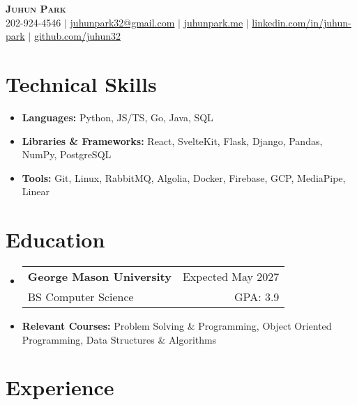 \documentclass[letterpaper,11pt]{article}
\makeatletter
\newcommand{\resumeItem}[1]{
  \item{
    {#1}
  }
}
\newcommand{\resumeItemThin}[1]{
  \item{
    {#1 \vspace{-5pt}}
  }
}
\newcommand{\resumeSubheading}[4]{
    \item
    \begin{tabular*}{0.985\textwidth}[t]{l@{\extracolsep{\fill}}r@{\hspace{-0.1in}}}
        {\textbf{#1}} & {#2} \\
        #3 &  #4 \\
    \end{tabular*}\vspace{-5pt}
}
\newcommand{\resumeSubHeadingListStart}{\begin{itemize}[leftmargin=0.00in, rightmargin=-0.2in, label={}]\vspace{3pt}}
\newcommand{\resumeSubHeadingListEnd}{\end{itemize}\vspace{-15pt}}
\newcommand{\resumeItemListStart}{\vspace{3pt}\begin{itemize}[leftmargin=0.15in, rightmargin=0.15in]}
\newcommand{\resumeItemListEnd}{\end{itemize}\vspace{-5pt}}
\makeatother
\begin{document}

\begin{center}
  \textbf{\Huge \scshape {Juhun Park}} \\ \vspace{3pt}
   202-924-4546 $|$
  \href{mailto:juhunpark32@gmail.com}{juhunpark32@gmail.com} $|$
  \href{https://www.juhunpark.me/}{juhunpark.me} $|$
  \href{https://linkedin.com/in/juhun-park}{linkedin.com/in/juhun-park} $|$
  \href{https://github.com/juhun32}{github.com/juhun32} \\
\end{center}

\vspace{-10pt}


\section{Technical Skills}
\resumeItemListStart
\resumeItemThin{\textbf{Languages: }{Python, JS/TS, Go, Java, SQL}}\\
\resumeItemThin{\textbf{Libraries \& Frameworks: }{React, SvelteKit, Flask, Django, Pandas, NumPy, PostgreSQL}}\\
\resumeItemThin{\textbf{Tools: }{Git, Linux, RabbitMQ, Algolia, Docker, Firebase, GCP, MediaPipe, Linear}}\\

\resumeItemListEnd


\section{Education}
\resumeSubHeadingListStart
\resumeSubheading
{George Mason University}{Expected May 2027}
{BS Computer Science}{GPA: 3.9}
\resumeItem{\textbf{Relevant Courses: }{Problem Solving \& Programming, Object Oriented Programming, Data Structures \& Algorithms}}
\vspace{-5pt}
\resumeSubHeadingListEnd


\section{Experience}
\end{document}
